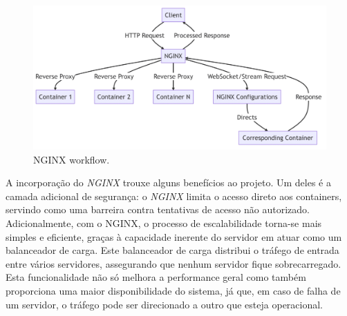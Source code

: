 \begin{figure}[htbp]
	\centering
	\includegraphics[width=\textwidth]{images/diagrama_nginx.png}
	\caption{NGINX workflow.}
	\label{fig:nginx_workflow}
\end{figure}

A incorporação do \textit{NGINX} trouxe alguns benefícios ao projeto. Um deles é a camada adicional de segurança: o \textit{NGINX} limita o acesso direto aos containers, servindo como uma barreira contra tentativas de acesso não autorizado. Adicionalmente, com o NGINX, o processo de escalabilidade torna-se mais simples e eficiente, graças à capacidade inerente do servidor em atuar como um balanceador de carga. Este balanceador de carga distribui o tráfego de entrada entre vários servidores, assegurando que nenhum servidor fique sobrecarregado. Esta funcionalidade não só melhora a performance geral como também proporciona uma maior disponibilidade do sistema, já que, em caso de falha de um servidor, o tráfego pode ser direcionado a outro que esteja operacional.
